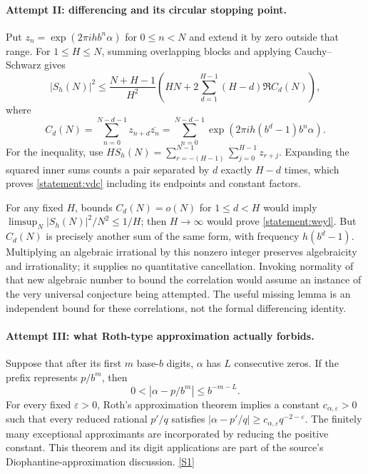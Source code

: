 \documentclass[11pt,a4paper]{article}
\newcommand{\sref}[2]{\hyperlink{source:#1:#2}{[S#2]}}
\numberwithin{equation}{section}
\begin{document}
\paragraph{Attempt II: differencing and its circular stopping point.}
Put $z_n=\exp(2\pi i h b^n\alpha)$ for $0\leq n<N$ and extend it by
zero outside that range.  For $1\leq H\leq N$, summing overlapping
blocks and applying Cauchy--Schwarz gives
\begin{equation}\label{statement:vdc}
 |S_h(N)|^2\leq\frac{N+H-1}{H^2}
 \left(HN+2\sum_{d=1}^{H-1}(H-d)\Re C_d(N)\right),
\end{equation}
where
\[
 C_d(N)=\sum_{n=0}^{N-d-1}z_{n+d}\overline{z_n}
       =\sum_{n=0}^{N-d-1}
           \exp(2\pi i h(b^d-1)b^n\alpha).
\]
For the inequality, use
$HS_h(N)=\sum_{r=-(H-1)}^{N-1}\sum_{j=0}^{H-1}z_{r+j}$.
Expanding the squared inner sums counts a pair separated by $d$
exactly $H-d$ times, which proves \eqref{statement:vdc} including its
endpoints and constant factors.

For any fixed $H$, bounds $C_d(N)=o(N)$ for $1\leq d<H$ would imply
$\limsup_N|S_h(N)|^2/N^2\leq1/H$; then $H\to\infty$ would prove
\eqref{statement:weyl}.  But $C_d(N)$ is precisely another sum of the same
form, with frequency $h(b^d-1)$.  Multiplying an algebraic irrational
by this nonzero integer preserves algebraicity and irrationality;
it supplies no quantitative cancellation.  Invoking normality of
that new algebraic number to bound the correlation would assume an
instance of the very universal conjecture being attempted.  The
useful missing lemma is an independent bound for these correlations,
not the formal differencing identity.

\paragraph{Attempt III: what Roth-type approximation actually forbids.}
Suppose that after its first $m$ base-$b$ digits, $\alpha$ has $L$
consecutive zeros.  If the prefix represents $p/b^m$, then
\[
 0<|\alpha-p/b^m|\leq b^{-m-L}.
\]
For every fixed $\varepsilon>0$, Roth's approximation theorem implies
a constant $c_{\alpha,\varepsilon}>0$ such that every reduced rational
$p'/q$ satisfies
$|\alpha-p'/q|\geq c_{\alpha,\varepsilon}q^{-2-\varepsilon}$.
The finitely many exceptional approximants are incorporated by reducing
the positive constant.  This theorem and its digit applications are
part of the source's Diophantine-approximation discussion.
\sref{statement}{1}
\end{document}

